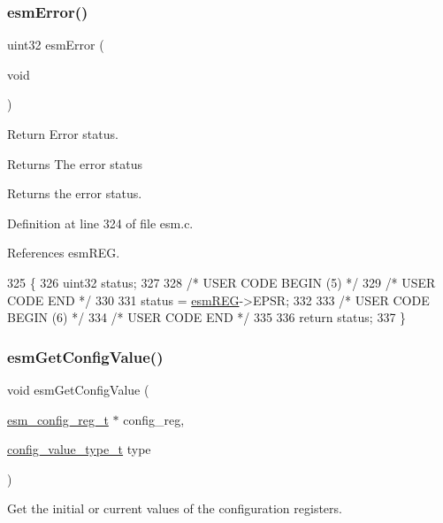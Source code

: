 \subsubsection{\texorpdfstring{esm\+Error()}{esmError()}}
{\footnotesize\ttfamily uint32 esm\+Error (\begin{DoxyParamCaption}\item[{void}]{ }\end{DoxyParamCaption})}



Return Error status. 

\begin{DoxyReturn}{Returns}
The error status
\end{DoxyReturn}
Returns the error status. 

Definition at line 324 of file esm.\+c.



References esm\+R\+EG.


\begin{DoxyCode}
325 \{
326     uint32 status;
327 
328 \textcolor{comment}{/* USER CODE BEGIN (5) */}
329 \textcolor{comment}{/* USER CODE END */}
330 
331     status = \mbox{\hyperlink{reg__esm_8h_a7c2e779f2973e0c2c9496a4796df10f1}{esmREG}}->EPSR;
332 
333 \textcolor{comment}{/* USER CODE BEGIN (6) */}
334 \textcolor{comment}{/* USER CODE END */}
335 
336     \textcolor{keywordflow}{return} status;
337 \}
\end{DoxyCode}
\mbox{\label{group__ESM_ga0b2e9a4b3b1e4dd57f496bda7bbb854c}} 
\subsubsection{\texorpdfstring{esm\+Get\+Config\+Value()}{esmGetConfigValue()}}
{\footnotesize\ttfamily void esm\+Get\+Config\+Value (\begin{DoxyParamCaption}\item[{\mbox{\hyperlink{structesm__config__reg}{esm\+\_\+config\+\_\+reg\+\_\+t}} $\ast$}]{config\+\_\+reg,  }\item[{\mbox{\hyperlink{sys__common_8h_a9daf9a5992391b058477d28d107ee5e2}{config\+\_\+value\+\_\+type\+\_\+t}}}]{type }\end{DoxyParamCaption})}



Get the initial or current values of the configuration registers. 


